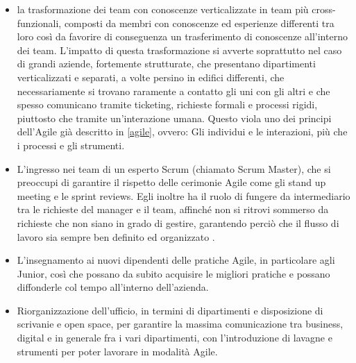 \documentclass[a4paper, 12pt]{report}
\numberwithin{equation}{section}
\begin{document}
\begin{itemize}
    \item la trasformazione dei team con conoscenze verticalizzate in team più cross-funzionali, composti da membri con conoscenze ed esperienze differenti tra loro così da favorire di conseguenza un trasferimento di conoscenze all’interno dei team. L’impatto di questa trasformazione si avverte soprattutto nel caso di grandi aziende, fortemente strutturate, che presentano dipartimenti verticalizzati e separati, a volte persino in edifici differenti, che necessariamente si trovano raramente a contatto gli uni con gli altri e che spesso comunicano tramite ticketing, richieste formali e processi rigidi, piuttosto che tramite un’interazione umana. Questo viola uno dei principi dell’Agile già descritto in \ref{agile}, ovvero: Gli individui e le interazioni, più che i processi e gli strumenti.
    \item L’ingresso nei team di un esperto Scrum (chiamato Scrum Master), che si preoccupi di garantire il rispetto delle cerimonie Agile come gli stand up meeting e le sprint reviews. Egli inoltre ha il ruolo di fungere da intermediario tra le richieste del manager e il team, affinché non si ritrovi sommerso da richieste che non siano in grado di gestire, garantendo perciò che il flusso di lavoro sia sempre ben definito ed organizzato \cite{scrum-ruoli}.
    \item L’insegnamento ai nuovi dipendenti delle pratiche Agile, in particolare agli Junior, così che possano da subito acquisire le migliori pratiche e possano diffonderle col tempo all’interno dell’azienda.
    \item Riorganizzazione dell’ufficio, in termini di dipartimenti e disposizione di scrivanie e open space, per garantire la massima comunicazione tra business, digital e in generale fra i vari dipartimenti, con l’introduzione di lavagne e strumenti per poter lavorare in modalità Agile.
\end{itemize}
\end{document}
